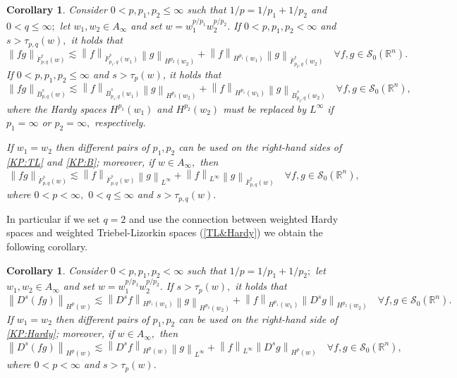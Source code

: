 \documentclass[10pt,a4paper]{article}
\newtheorem{corollary}[theorem]{Corollary}
\theoremstyle{remark}
\newcommand{\rn}{{{\mathbb R}^n}}
\newcommand{\swz}{{\mathcal{S}_0}(\rn)}
\newcommand{\tlw}[4]{\dot F_{#1,#3}^{#2}(#4)} %
\newcommand{\besw}[4]{\dot B_{#1,#3}^{#2}(#4)} %
\newcommand{\norm}[2]{\left\|#1\right\|_{#2}}
\newcommand{\hcline}{1/p=1/p_1+1/p_2}
\begin{document}
\begin{corollary}\label{coro:KP:TL:B}  Consider  $0 < p, p_1, p_2  \le \infty$  such that $\hcline$ and  $0 < q \leq \infty;$ let  $w_1,w_2\in A_\infty$ and set $w=w_1^{{p}/{p_1}} w_2^{{p}/{p_2}}.$ 
If $0 < p ,p_1,p_2< \infty$ and  $s > \tau_{p,q}(w),$ it holds that
\begin{equation}\label{KP:TL}
\norm{fg}{\tlw{p}{s}{q}{w}} \lesssim \norm{f}{\tlw{p_1}{s}{q}{w_1}} \norm{g}{H^{p_2}(w_2)} +  \norm{f}{H^{p_1}(w_1)}   \norm{g}{\tlw{p_2}{s}{q}{w_2}} \quad \forall f, g \in \swz.
\end{equation}
If $0 < p, p_1,p_2 \le \infty$ and $s > \tau_p(w)$, it holds that
\begin{equation}\label{KP:B}
\norm{fg}{\besw{p}{s}{q}{w}} \lesssim \norm{f}{\besw{p_1}{s}{q}{w_1}} \norm{g}{H^{p_2}(w_2)} +  \norm{f}{H^{p_1}(w_1)}   \norm{g}{\besw{p_2}{s}{q}{w_2}} \quad \forall f, g \in \swz,
\end{equation}
where the Hardy spaces $H^{p_1}(w_1)$ and $H^{p_2}(w_2)$ must be replaced by $L^\infty$ if $p_1=\infty$ or $p_2=\infty,$ respectively.

If $w_1=w_2$ then different pairs of $p_1, p_2$ can be used on the right-hand sides of \eqref{KP:TL} and \eqref{KP:B}; moreover, if $w\in A_\infty,$ then 
\begin{equation}\label{KP:TL2}
\norm{fg}{\tlw{p}{s}{q}{w}} \lesssim \norm{f}{\tlw{p}{s}{q}{w}} \norm{g}{L^\infty} +  \norm{f}{L^\infty}   \norm{g}{\tlw{p}{s}{q}{w}} \quad \forall f, g \in \swz,
\end{equation}
where $0<p<\infty,$ $0<q\le \infty$ and $s>\tau_{p,q}(w).$
\end{corollary}


In particular if we set $q=2$ and use the connection between weighted Hardy spaces and weighted Triebel-Lizorkin spaces (\ref{TL&Hardy}) we obtain the following corollary. 

\begin{corollary}\label{coro:KP:Hardy} 
Consider  $0 < p, p_1, p_2  < \infty$  such that $\hcline;$ let  $w_1,w_2\in A_\infty$ and set $w=w_1^{{p}/{p_1}} w_2^{{p}/{p_2}}.$ 
If  $s > \tau_{p}(w),$ it holds that
\begin{equation}\label{KP:Hardy}
\norm{D^s(fg)}{H^p(w)} \lesssim \norm{D^s f}{H^{p_1}(w_1)} \norm{g}{H^{p_2}(w_2)} +  \norm{f}{H^{p_1}(w_1)}   \norm{D^s g}{H^{p_2}(w_2)} \quad \forall f, g \in \swz.
\end{equation}
If $w_1=w_2$ then different pairs of $p_1, p_2$ can be used on the right-hand side of \eqref{KP:Hardy}; moreover, if $w\in A_\infty,$ then 
\begin{equation*}
\norm{D^s(fg)}{H^p(w)} \lesssim \norm{D^s f}{H^{p}(w)} \norm{g}{L^\infty} +  \norm{f}{L^\infty}   \norm{D^s g}{H^{p}(w)} \quad \forall f, g \in \swz,
\end{equation*}
where $0<p<\infty$ and $s>\tau_{p}(w).$
\end{corollary}
 
\end{document}
